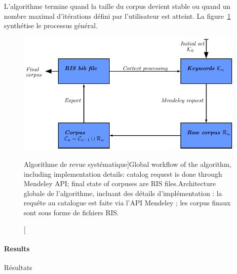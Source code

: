 {L'algorithme termine quand la taille du corpus devient stable ou quand un nombre maximal d'itérations défini par l'utilisateur est atteint. La figure~\ref{fig:quantepistemo:algo} synthétise le processus général.
}


\begin{figure}
\centering
\includegraphics[width=\textwidth]{Figures/QuantEpistemo/schema_algo}
\caption[Systematic review algorithm workflow][Algorithme de revue systématique]{Global workflow of the algorithm, including implementation details: catalog request is done through Mendeley API; final state of corpuses are RIS files.}{Architecture globale de l'algorithme, incluant des détails d'implémentation : la requête au catalogue est faite via l'API Mendeley ; les corpus finaux sont sous forme de fichiers RIS.}
\label{fig:quantepistemo:algo}
\end{figure}



\paragraph{Results}{Résultats}



